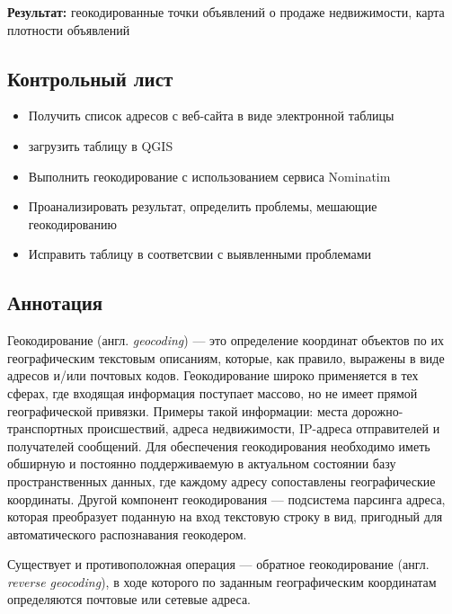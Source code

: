 \documentclass[
  12pt,
]{book}
\providecommand{\tightlist}{%
  \setlength{\itemsep}{0pt}\setlength{\parskip}{0pt}}
\begin{document}
\textbf{Результат:} геокодированные точки объявлений о продаже недвижимости, карта плотности объявлений

\hypertarget{geocoding-control}{%
\subsection{Контрольный лист}\label{geocoding-control}}

\begin{itemize}
\tightlist
\item
  Получить список адресов с веб-сайта в виде электронной таблицы
\item
  загрузить таблицу в QGIS
\item
  Выполнить геокодирование с использованием сервиса Nominatim
\item
  Проанализировать результат, определить проблемы, мешающие геокодированию
\item
  Исправить таблицу в соответсвии с выявленными проблемами
\end{itemize}

\hypertarget{geocoding-annotation}{%
\subsection{Аннотация}\label{geocoding-annotation}}

Геокодирование (англ. \emph{geocoding}) --- это определение координат объектов по их географическим текстовым описаниям, которые, как правило, выражены в виде адресов и/или почтовых кодов. Геокодирование широко применяется в тех сферах, где входящая информация поступает массово, но не имеет прямой географической привязки. Примеры такой информации: места дорожно-транспортных происшествий, адреса недвижимости, IP-адреса отправителей и получателей сообщений. Для обеспечения геокодирования необходимо иметь обширную и постоянно поддерживаемую в актуальном состоянии базу пространственных данных, где каждому адресу сопоставлены географические координаты. Другой компонент геокодирования --- подсистема парсинга адреса, которая преобразует поданную на вход текстовую строку в вид, пригодный для автоматического распознавания геокодером.

Существует и противоположная операция --- обратное геокодирование (англ. \emph{reverse geocoding}), в ходе которого по заданным географическим координатам определяются почтовые или сетевые адреса.
\end{document}
